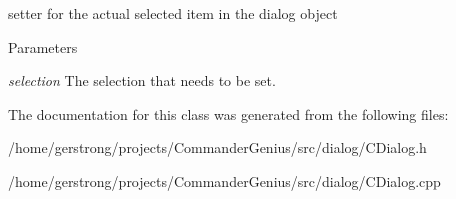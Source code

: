 setter for the actual selected item in the dialog object 


\begin{DoxyParams}{Parameters}
\item[{\em selection}]The selection that needs to be set. \end{DoxyParams}


The documentation for this class was generated from the following files:\begin{DoxyCompactItemize}
\item 
/home/gerstrong/projects/CommanderGenius/src/dialog/CDialog.h\item 
/home/gerstrong/projects/CommanderGenius/src/dialog/CDialog.cpp\end{DoxyCompactItemize}
